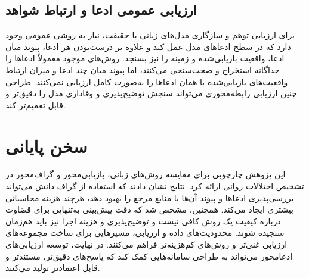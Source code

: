\subsection{ارزیابی عمومی ادعا و ارتباط شواهد}

برای ارزیابی توهم و سازگاری مدل‌های زبانی با حقیقت، نیاز به روشی عمومی وجود دارد که در سطح ادعاهای مدل عمل کند و علاوه بر درست‌بودن هر ادعا، پیوند میان ادعا، واقعیت بازیابی‌شده و زمینه را نیز بسنجد. روش‌های موجود معمولاً ادعاها را جداگانه استخراج و صحت‌سنجی می‌کنند، اما پیوند میان چند ادعا و میزان ارتباط واقعیت‌های بازیابی‌شده با همان ادعاها را به‌صورت کامل ارزیابی نمی‌کنند. طراحی چنین ارزیابی رابطه‌محوری می‌تواند سنجش توضیح‌پذیری و وفاداری مدل را دقیق‌تر و قابل تعمیم‌تر کند.

\section{سخن پایانی}
این پژوهش چارچوبی برای مقایسه روش‌های زبانی، بازیابی‌محور و گراف‌محور در تشخیص اختلالات روانی ارائه کرد. نتایج نشان دادند که استفاده از گراف دانش می‌تواند بررسی‌پذیری ادعاها و پیوند آن‌ها با منابع مرجع را بهبود دهد، هرچند هزینه محاسباتی بیشتری ایجاد می‌کند. همچنین، مشخص شد که دقت پیش‌بینی به‌تنهایی برای قضاوت درباره کیفیت یک روش کافی نیست و توضیح‌پذیری و هزینه اجرا نیز باید هم‌زمان سنجیده شوند. محدودیت‌های داده و ارزیابی، مسیرهایی برای ساخت مجموعه‌های ارزیابی غنی‌تر و روش‌های کم‌هزینه‌تر فراهم می‌کنند. در نهایت، توسعه ارزیابی‌های ادعا‌محور می‌تواند به طراحی سامانه‌هایی کمک کند که پاسخ‌های دقیق‌تر، مستندتر و قابل اعتمادتر تولید می‌کنند.
